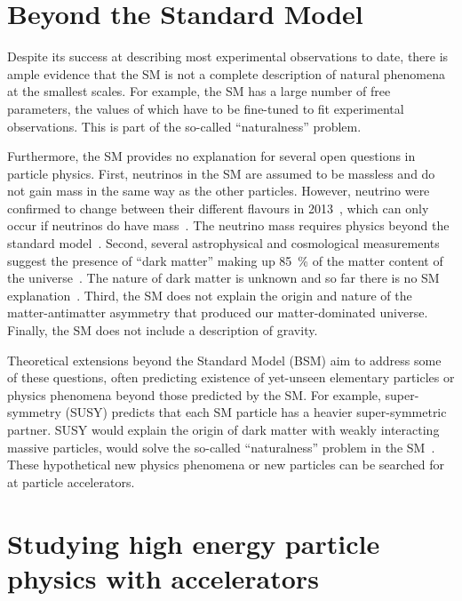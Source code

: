 \section{Beyond the Standard Model}

Despite its success at describing most experimental observations to date, there is ample evidence that the SM is not a complete description of natural phenomena at the smallest scales. For example, the SM has a large number of free parameters, the values of which have to be fine-tuned to fit experimental observations. This is part of the so-called ``naturalness'' problem.

Furthermore, the SM provides no explanation for several open questions in particle physics. First, neutrinos in the SM are assumed to be massless and do not gain mass in the same way as the other particles. However, neutrino were confirmed to change between their different flavours in 2013~\cite{aharmim_combined_2013}, which can only occur if neutrinos do have mass~\cite{pontecorvo_neutrino_1967}. The neutrino mass requires physics beyond the standard model~\cite{bilenky_massive_1987}. Second, several astrophysical and cosmological measurements suggest the presence of ``dark matter'' making up 85~\% of the matter content of the universe~\cite{young_survey_2017}. The nature of dark matter is unknown and so far there is no SM explanation~\cite{munoz_dark_2004}. Third, the SM does not explain the origin and nature of the matter-antimatter asymmetry that produced our matter-dominated universe. Finally, the SM does not include a description of gravity.

Theoretical extensions beyond the Standard Model (BSM) aim to address some of these questions, often predicting existence of yet-unseen elementary particles or physics phenomena beyond those predicted by the SM. For example, super-symmetry (SUSY) predicts that each SM particle has a heavier super-symmetric partner. SUSY would explain the origin of dark matter with weakly interacting massive particles, would solve the so-called ``naturalness'' problem in the SM~\cite{jungman_supersymmetric_1996}. These hypothetical new physics phenomena or new particles can be searched for at particle accelerators. 

\section{Studying high energy particle physics with accelerators}

